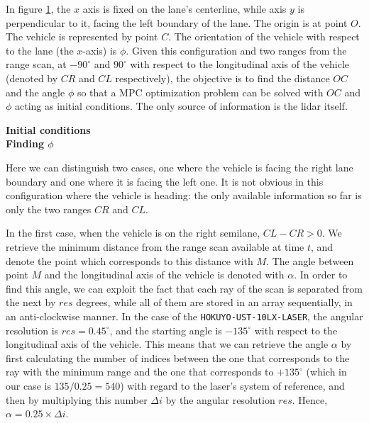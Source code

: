In figure \ref{fig:centerline_mpc}, the $x$ axis is fixed on the lane's
centerline, while axis $y$ is perpendicular to it, facing the left boundary of
the lane. The origin is at point
$O$. The vehicle is represented by point $C$. The orientation of the vehicle
with respect to the lane (the $x$-axis) is $\phi$. Given this configuration
and two ranges from the range scan, at $-90^{\circ}$ and $90^{\circ}$ with
respect to the longitudinal axis of the vehicle (denoted by $CR$ and
$CL$ respectively), the objective is to find the distance $OC$ and the angle
$\phi$ so that a MPC optimization problem can be solved with $OC$ and $\phi$
acting as initial conditions. The only source of information is the lidar itself.

\begin{figure}[H]\centering
  \scalebox{1}{}
  \caption{}
  \label{fig:centerline_mpc}
\end{figure}


\textbf{Initial conditions} \\

\textbf{Finding $\phi$}

Here we can distinguish two cases, one where the vehicle is facing the right
lane boundary and one where it is facing the left one. It is not obvious
in this configuration where the vehicle is heading: the only available
information so far is only the two ranges $CR$ and $CL$.

In the first case, when the vehicle is on the right semilane, $CL-CR > 0$.
We retrieve the minimum distance from the range scan available at time $t$,
and denote the point which corresponds to this distance with $M$. The angle
between point $M$ and the longitudinal axis of the vehicle is denoted with
$\alpha$. In order to find this angle, we can exploit the fact that each ray
of the scan is separated from the next by $res$ degrees, while all of them
are stored in an array sequentially, in an anti-clockwise manner. In the case
of the \texttt{HOKUYO-UST-10LX-LASER}, the angular resolution is
$res=0.45^{\circ}$, and the starting angle is $-135^{\circ}$ with respect to the
longitudinal axis of the vehicle. This means that we can retrieve the angle
$\alpha$ by first calculating the number of indices between the one that
corresponds to the ray with the minimum range and the one that corresponds
to $+135^{\circ}$ (which in our case is $135 / 0.25 = 540$) with regard to the
laser's system of reference, and then by multiplying this number $\Delta i$ by
the angular resolution $res$. Hence, $\alpha = 0.25 \times \Delta i$.

